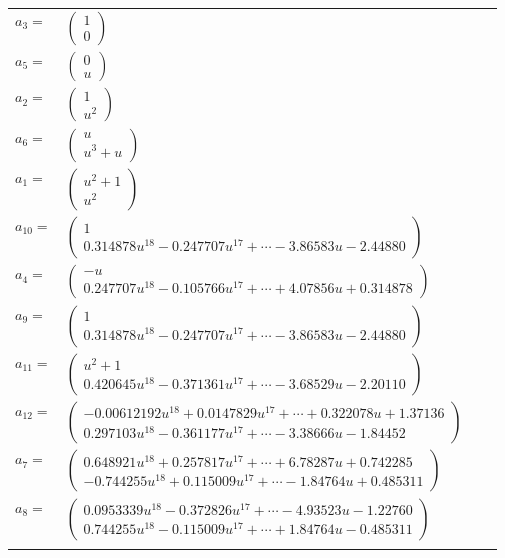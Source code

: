 \documentclass[1p]{elsarticle_modified}
\theoremstyle{definition}
\begin{document}
\begin{tabular}{m{7pt} m{180pt} m{7pt} m{180pt} }
\flushright $a_{3}=$&$\begin{pmatrix}1\\0\end{pmatrix}$ \\
\flushright $a_{5}=$&$\begin{pmatrix}0\\u\end{pmatrix}$ \\
\flushright $a_{2}=$&$\begin{pmatrix}1\\u^2\end{pmatrix}$ \\
\flushright $a_{6}=$&$\begin{pmatrix}u\\u^3+u\end{pmatrix}$ \\
\flushright $a_{1}=$&$\begin{pmatrix}u^2+1\\u^2\end{pmatrix}$ \\
\flushright $a_{10}=$&$\begin{pmatrix}1\\0.314878 u^{18}-0.247707 u^{17}+\cdots-3.86583 u-2.44880\end{pmatrix}$ \\
\flushright $a_{4}=$&$\begin{pmatrix}- u\\0.247707 u^{18}-0.105766 u^{17}+\cdots+4.07856 u+0.314878\end{pmatrix}$ \\
\flushright $a_{9}=$&$\begin{pmatrix}1\\0.314878 u^{18}-0.247707 u^{17}+\cdots-3.86583 u-2.44880\end{pmatrix}$ \\
\flushright $a_{11}=$&$\begin{pmatrix}u^2+1\\0.420645 u^{18}-0.371361 u^{17}+\cdots-3.68529 u-2.20110\end{pmatrix}$ \\
\flushright $a_{12}=$&$\begin{pmatrix}-0.00612192 u^{18}+0.0147829 u^{17}+\cdots+0.322078 u+1.37136\\0.297103 u^{18}-0.361177 u^{17}+\cdots-3.38666 u-1.84452\end{pmatrix}$ \\
\flushright $a_{7}=$&$\begin{pmatrix}0.648921 u^{18}+0.257817 u^{17}+\cdots+6.78287 u+0.742285\\-0.744255 u^{18}+0.115009 u^{17}+\cdots-1.84764 u+0.485311\end{pmatrix}$ \\
\flushright $a_{8}=$&$\begin{pmatrix}0.0953339 u^{18}-0.372826 u^{17}+\cdots-4.93523 u-1.22760\\0.744255 u^{18}-0.115009 u^{17}+\cdots+1.84764 u-0.485311\end{pmatrix}$\\&\end{tabular}
\end{document}
